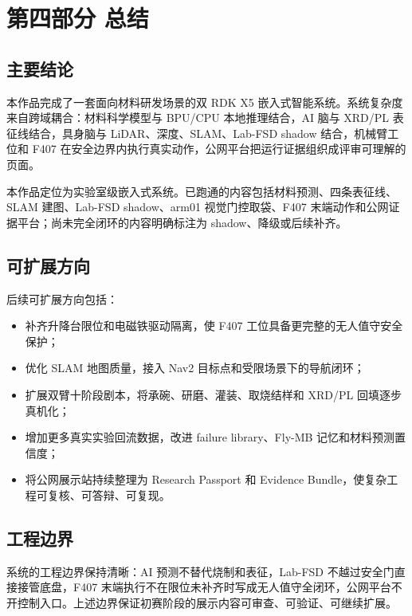 \section{第四部分 总结}

\subsection{主要结论}
本作品完成了一套面向材料研发场景的双 RDK X5 嵌入式智能系统。系统复杂度来自跨域耦合：材料科学模型与 BPU/CPU 本地推理结合，AI 脑与 XRD/PL 表征线结合，具身脑与 LiDAR、深度、SLAM、Lab-FSD shadow 结合，机械臂工位和 F407 在安全边界内执行真实动作，公网平台把运行证据组织成评审可理解的页面。

本作品定位为实验室级嵌入式系统。已跑通的内容包括材料预测、四条表征线、SLAM 建图、Lab-FSD shadow、arm01 视觉门控取袋、F407 末端动作和公网证据平台；尚未完全闭环的内容明确标注为 shadow、降级或后续补齐。

\subsection{可扩展方向}
后续可扩展方向包括：
\begin{itemize}
  \item 补齐升降台限位和电磁铁驱动隔离，使 F407 工位具备更完整的无人值守安全保护；
  \item 优化 SLAM 地图质量，接入 Nav2 目标点和受限场景下的导航闭环；
  \item 扩展双臂十阶段剧本，将承碗、研磨、灌装、取烧结样和 XRD/PL 回填逐步真机化；
  \item 增加更多真实实验回流数据，改进 failure library、Fly-MB 记忆和材料预测置信度；
  \item 将公网展示站持续整理为 Research Passport 和 Evidence Bundle，使复杂工程可复核、可答辩、可复现。
\end{itemize}

\subsection{工程边界}
系统的工程边界保持清晰：AI 预测不替代烧制和表征，Lab-FSD 不越过安全门直接接管底盘，F407 末端执行不在限位未补齐时写成无人值守全闭环，公网平台不开控制入口。上述边界保证初赛阶段的展示内容可审查、可验证、可继续扩展。
